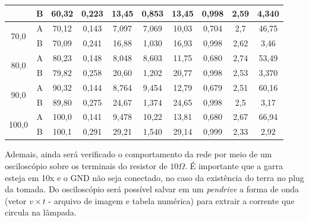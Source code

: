 \documentclass[a4paper,12pt,oneside,openany,table,xcdraw]{article}
\begin{document}
\begin{table}[H]
{\begin{tabular}{|c|c|c|c|c|c|c|c|c|c|}
 & B & 60,32 & 0,223 & 13,45 & 0,853 & 13,45 & 0,998 & 2,59 & 4,340 \\ \hline
\multirow{2}{*}{70,0} & A & 70,12 & 0,143 & 7,097 & 7,069 & 10,03 & 0,704 & 2,7 & 46,75\\ \cline{2-10} 
 & B & 70,09 & 0,241 & 16,88 & 1,030 & 16,93 & 0,998 & 2,62 & 3,46 \\ \hline
\multirow{2}{*}{80,0} & A &  80,23 & 0,148 & 8,048 & 8,603 & 11,75 & 0,680 & 2,74 & 53,49 \\ \cline{2-10} 
 & B &  79,82 & 0,258 & 20,60 & 1,202 & 20,77 & 0,998 & 2,53 & 3,370\\ \hline
\multirow{2}{*}{90,0} & A & 90,32 & 0,144 & 8,764 & 9,454 & 12,79 & 0,679 & 2,51 & 60,16\\ \cline{2-10} 
 & B &  89,80 & 0,275 & 24,67 & 1,374 & 24,65 & 0,998 & 2,5 & 3,17 \\ \hline
\multirow{2}{*}{100,0} & A &  100,0 & 0,141 & 9,478 & 10,22 & 13,81 & 0,680 & 2,67 & 66,94 \\ \cline{2-10} 
 & B & 100,1 & 0,291 & 29,21 & 1,540 & 29,14 & 0,999 & 2,33 & 2,92\\ \hline
\end{tabular}%
}
\end{table}
\vspace{0.3cm}

Ademais, ainda será verificado o comportamento da rede por meio de um osciloscópio sobre os terminais do resistor de $10 \Omega$. É importante que a garra esteja em 10x e o GND não seja conectado, no caso da existência do terra no plug da tomada. Do osciloscópio será possível salvar em um \emph{pendrive} a forma de onda (vetor $v \times t$ - arquivo de imagem e
tabela numérica) para extrair a corrente que circula na lâmpada.
\end{document}
